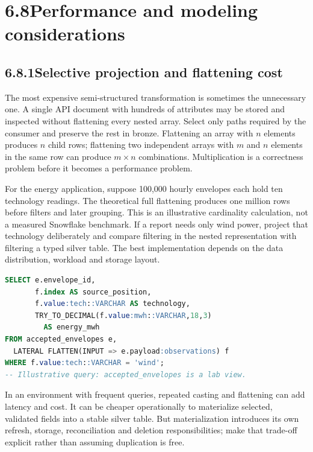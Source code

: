 \documentclass[11pt,twoside]{article}
\newcommand{\topic}[2]{\subsection*{#1\quad #2}}
\begin{document}
\section*{6.8\quad Performance and modeling considerations}
\topic{6.8.1}{Selective projection and flattening cost}
The most expensive semi-structured transformation is sometimes the unnecessary one. A single API document with hundreds of attributes may be stored and inspected without flattening every nested array. Select only paths required by the consumer and preserve the rest in bronze. Flattening an array with $n$ elements produces $n$ child rows; flattening two independent arrays with $m$ and $n$ elements in the same row can produce $m\times n$ combinations. Multiplication is a correctness problem before it becomes a performance problem.

For the energy application, suppose 100{,}000 hourly envelopes each hold ten technology readings. The theoretical full flattening produces one million rows before filters and later grouping. This is an illustrative cardinality calculation, not a measured Snowflake benchmark. If a report needs only wind power, project that technology deliberately and compare filtering in the nested representation with filtering a typed silver table. The best implementation depends on the data distribution, workload and storage layout.

\begin{lstlisting}[language=SQL,caption={Project only the contracted columns needed downstream.}]
SELECT e.envelope_id,
       f.index AS source_position,
       f.value:tech::VARCHAR AS technology,
       TRY_TO_DECIMAL(f.value:mwh::VARCHAR,18,3)
         AS energy_mwh
FROM accepted_envelopes e,
  LATERAL FLATTEN(INPUT => e.payload:observations) f
WHERE f.value:tech::VARCHAR = 'wind';
-- Illustrative query: accepted_envelopes is a lab view.
\end{lstlisting}
In an environment with frequent queries, repeated casting and flattening can add latency and cost. It can be cheaper operationally to materialize selected, validated fields into a stable silver table. But materialization introduces its own refresh, storage, reconciliation and deletion responsibilities; make that trade-off explicit rather than assuming duplication is free.
\end{document}
